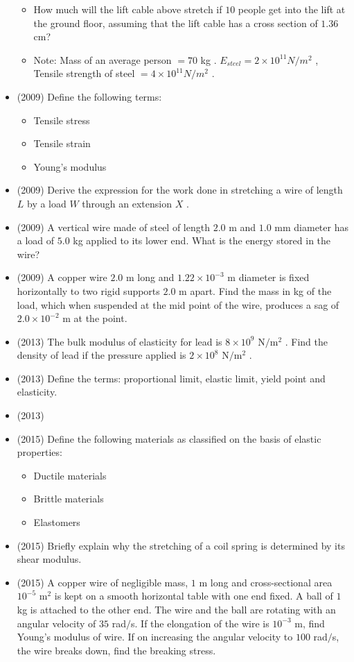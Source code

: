 \documentclass{article}
\begin{document}
\begin{itemize}
\begin{itemize}
\item How much will the lift cable above stretch if $ 10$ people get into the lift at the ground floor, assuming that the lift cable has a cross section of $ 1.36$ cm? 
\item Note: Mass of an average person $ =70$ kg . $ E_{steel}=2 \times 10^{11}N/m^{2}$ , Tensile strength of steel $ =4 \times 10^{11}N/m^{2}$ .
\end{itemize}
\item (2009)  Define the following terms:\begin{itemize}
\item Tensile stress
\item Tensile strain
\item Young’s modulus
\end{itemize}
\item (2009)  Derive the expression for the work done in stretching a wire of length $ L$ by a load $ W$ through an extension $ X$ .
\item (2009)  A vertical wire made of steel of length $ 2.0$ m and $ 1.0$ mm diameter has a load of $ 5.0$ kg applied to its lower end.  What is the energy stored in the wire?
\item (2009)  A copper wire $ 2.0$ m long and $ 1.22 \times 10^{-3}$ m diameter is fixed horizontally to two rigid supports $ 2.0$ m apart.  Find the mass in kg of the load, which when suspended at the mid point of the wire, produces a sag of $ 2.0 \times 10^{-2}$ m at the point.
\item (2013)  The bulk modulus of elasticity for lead is $ 8 \times 10^{9}$ N$/$m$ ^{2}$ . Find the density of lead if the pressure applied is $ 2 \times 10^{8}$ N$/$m$ ^{2}$ . 
\item (2013)  Define the terms: proportional limit, elastic limit, yield point and elasticity.
\item (2013)  \item (2015)  Define the following materials as classified on the basis of elastic properties:\begin{itemize}
\item  Ductile materials 
\item Brittle materials
\item Elastomers
\end{itemize}
\item (2015)  Briefly explain why the stretching of a coil spring is determined by its shear modulus.
\item (2015)  A copper wire of negligible mass, $ 1$ m long and cross-sectional area $ 10^{-5}$ m$ ^{2}$ is kept on a smooth horizontal table with one end fixed.  A ball of $ 1$ kg is attached to the other end.  The wire and the ball are rotating with an angular velocity of $ 35$ rad$/$s.  If the elongation of the wire is $ 10^{-3}$ m, find Young’s modulus of wire.  If on increasing the angular velocity to $ 100$ rad$/$s, the wire breaks down, find the breaking stress.

\end{itemize}
\end{document}
